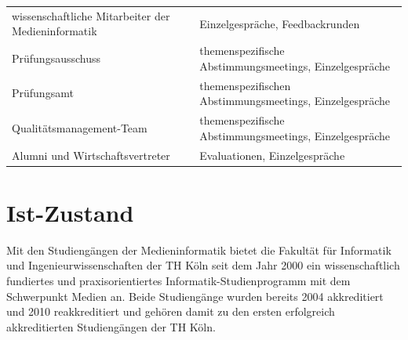 \begin{longtable}[]{@{}ll@{}}
\begin{minipage}[t]{0.5\columnwidth}
wissenschaftliche Mitarbeiter der Medieninformatik\strut
\end{minipage} & \begin{minipage}[t]{0.5\columnwidth}\raggedright\strut
Einzelgespräche, Feedbackrunden\strut
\end{minipage}\tabularnewline
\begin{minipage}[t]{0.5\columnwidth}\raggedright\strut
Prüfungsausschuss\strut
\end{minipage} & \begin{minipage}[t]{0.5\columnwidth}\raggedright\strut
themenspezifische Abstimmungsmeetings, Einzelgespräche\strut
\end{minipage}\tabularnewline
\begin{minipage}[t]{0.5\columnwidth}\raggedright\strut
Prüfungsamt\strut
\end{minipage} & \begin{minipage}[t]{0.5\columnwidth}\raggedright\strut
themenspezifischen Abstimmungsmeetings, Einzelgespräche\strut
\end{minipage}\tabularnewline
\begin{minipage}[t]{0.5\columnwidth}\raggedright\strut
Qualitätsmanagement-Team\strut
\end{minipage} & \begin{minipage}[t]{0.5\columnwidth}\raggedright\strut
themenspezifische Abstimmungsmeetings, Einzelgespräche\strut
\end{minipage}\tabularnewline
\begin{minipage}[t]{0.5\columnwidth}\raggedright\strut
Alumni und Wirtschaftsvertreter\strut
\end{minipage} & \begin{minipage}[t]{0.5\columnwidth}\raggedright\strut
Evaluationen, Einzelgespräche\strut
\end{minipage}\tabularnewline
\bottomrule
\end{longtable}

\chapter{Ist-Zustand}\label{ist-zustand}

Mit den Studiengängen der Medieninformatik bietet die Fakultät für
Informatik und Ingenieurwissenschaften der TH Köln seit dem Jahr 2000
ein wissenschaftlich fundiertes und praxisorientiertes
Informatik-Studienprogramm mit dem Schwerpunkt Medien an. Beide
Studiengänge wurden bereits 2004 akkreditiert und 2010 reakkreditiert
und gehören damit zu den ersten erfolgreich akkreditierten Studiengängen
der TH Köln.

